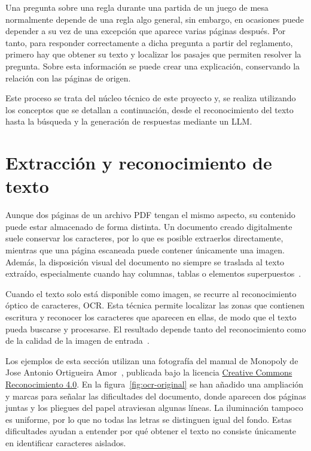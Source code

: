 
Una pregunta sobre una regla durante una partida de un juego de mesa normalmente depende de una regla algo general, sin embargo, en ocasiones puede depender a su vez de una excepción que aparece varias páginas después. Por tanto, para responder correctamente a dicha pregunta a partir del reglamento, primero hay que obtener su texto y localizar los pasajes que permiten resolver la pregunta. Sobre esta información se puede crear una explicación, conservando la relación con las páginas de origen.

Este proceso se trata del núcleo técnico de este proyecto y, se realiza utilizando los conceptos que se detallan a continuación, desde el reconocimiento del texto hasta la búsqueda y la generación de respuestas
mediante un \ac{LLM}.

\section{Extracción y reconocimiento de texto}

Aunque dos páginas de un archivo \acs{PDF} tengan el mismo aspecto, su
contenido puede estar almacenado de forma distinta. Un documento creado
digitalmente suele conservar los caracteres, por lo que es posible extraerlos
directamente, mientras que una página escaneada puede contener únicamente una
imagen. Además, la disposición visual del documento no siempre se traslada al
texto extraído, especialmente cuando hay columnas, tablas o elementos
superpuestos~\cite{pypdf_extraccion}.

Cuando el texto solo está disponible como imagen, se recurre al
reconocimiento óptico de caracteres, \acs{OCR}. Esta técnica permite localizar
las zonas que contienen escritura y reconocer los caracteres que aparecen en
ellas, de modo que el texto pueda buscarse y procesarse. El resultado depende
tanto del reconocimiento como de la calidad de la imagen de
entrada~\cite{tesseract_calidad}.

Los ejemplos de esta sección utilizan una fotografía del manual de Monopoly
de Jose Antonio Ortigueira Amor~\cite{ortigueira_monopoly_2022}, publicada bajo
la licencia \href{https://creativecommons.org/licenses/by/4.0/}{Creative Commons
Reconocimiento 4.0}. En la figura~\ref{fig:ocr-original} se han añadido una
ampliación y marcas para señalar las dificultades del documento, donde aparecen
dos páginas juntas y los pliegues del papel atraviesan algunas líneas.
La iluminación tampoco es
uniforme, por lo que no todas las letras se distinguen igual del fondo.
Estas dificultades ayudan a entender por qué obtener el texto no consiste
únicamente en identificar caracteres aislados.

